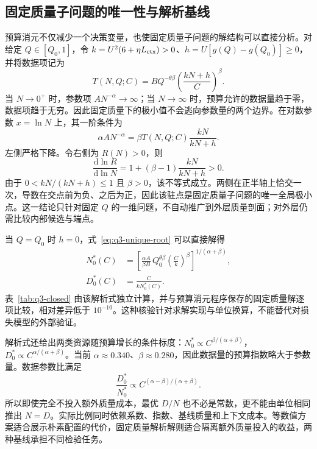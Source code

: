 \subsection{固定质量子问题的唯一性与解析基线}
预算消元不仅减少一个决策变量，也使固定质量子问题的解结构可以直接分析。对给定 $Q\in[Q_0,1]$，令 $k=U^2(6+\eta L_{\mathrm{ctx}})>0$、$h=U[g(Q)-g(Q_0)]\geq0$，并将数据项记为
\begin{equation}
T(N,Q;C)=BQ^{-\theta\beta}\left(\frac{kN+h}{C}\right)^\beta.
\label{eq:q3-data-term}
\end{equation}
当 $N\to0^+$ 时，参数项 $AN^{-\alpha}\to\infty$；当 $N\to\infty$ 时，预算允许的数据量趋于零，数据项趋于无穷。因此固定质量下的极小值不会逃向参数量的两个边界。在对数参数 $x=\ln N$ 上，其一阶条件为
\begin{equation}
\alpha AN^{-\alpha}
=\beta T(N,Q;C)\frac{kN}{kN+h}.
\label{eq:q3-unique-root}
\end{equation}
左侧严格下降。令右侧为 $R(N)>0$，则
\begin{equation}
\frac{\mathrm d\ln R}{\mathrm d\ln N}
=1+(\beta-1)\frac{kN}{kN+h}>0.
\label{eq:q3-monotone-root}
\end{equation}
由于 $0<kN/(kN+h)\leq1$ 且 $\beta>0$，该不等式成立。两侧在正半轴上恰交一次，导数在交点前为负、之后为正，因此该驻点是固定质量子问题的唯一全局极小点。这一结论只针对固定 $Q$ 的一维问题，不自动推广到外层质量剖面；对外层仍需比较内部候选与端点。

当 $Q=Q_0$ 时 $h=0$，式~\eqref{eq:q3-unique-root} 可以直接解得
\begin{align}
N_0^*(C)&=\left[\frac{\alpha A}{\beta B}\,Q_0^{\theta\beta}
\left(\frac{C}{k}\right)^\beta\right]^{1/(\alpha+\beta)},\label{eq:q3-fixed-closed}\\
D_0^*(C)&=\frac{C}{kN_0^*(C)}.
\end{align}
表~\ref{tab:q3-closed} 由该解析式独立计算，并与预算消元程序保存的固定质量解逐项比较，相对差异低于 $10^{-10}$。这种核验针对求解实现与单位换算，不能替代对损失模型的外部验证。



解析式还给出两类资源随预算增长的条件标度：$N_0^*\propto C^{\beta/(\alpha+\beta)}$，$D_0^*\propto C^{\alpha/(\alpha+\beta)}$。当前 $\alpha\approx0.340$、$\beta\approx0.280$，因此数据量的预算指数略大于参数量。数据参数比满足
\begin{equation}
\frac{D_0^*}{N_0^*}\propto C^{(\alpha-\beta)/(\alpha+\beta)}.
\label{eq:q3-ratio-scaling}
\end{equation}
所以即使完全不投入额外质量成本，最优 $D/N$ 也不必是常数，更不能由单位相同推出 $N=D$。实际比例同时依赖系数、指数、基线质量和上下文成本。等数值方案适合展示朴素配置的代价，固定质量解析解则适合隔离额外质量投入的收益，两种基线承担不同检验任务。

